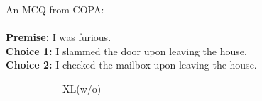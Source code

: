 \begin{example}\label{ex:copa2}
An MCQ from COPA:\\ \\
\noindent
\textbf{Premise:} I was furious.\\
\textbf{Choice 1:} I slammed the door upon leaving the house.  \checksymbol \\
\textbf{Choice 2:} I checked the mailbox upon leaving the house. \crosssymbol
\end{example}

\begin{figure}[th!]
\centering
\begin{subfigure}[b]{0.20\textwidth}
\centering
{}
\caption{XL(w/o)}
\label{fig:copa2_o}
\end{subfigure}
\hfill
\newpage
\begin{subfigure}[b]{0.20\textwidth}
\centering

\end{subfigure}
\end{figure}
